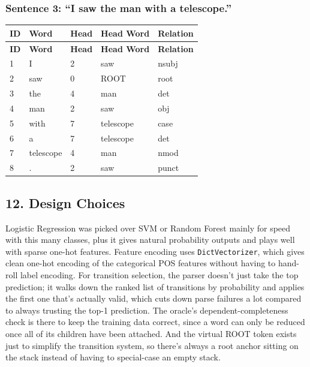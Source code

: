 \documentclass[11pt,a4paper]{article}
\begin{document}
\subsubsection*{Sentence 3: ``I saw the man with a telescope.''}

{\small
\setlength{\tabcolsep}{4pt}
\begin{longtable}{lllll}
\toprule
\textbf{ID} & \textbf{Word} & \textbf{Head} & \textbf{Head Word} & \textbf{Relation} \\
\midrule
\endfirsthead
\toprule
\textbf{ID} & \textbf{Word} & \textbf{Head} & \textbf{Head Word} & \textbf{Relation} \\
\midrule
\endhead
1 & I & 2 & saw & nsubj \\
2 & saw & 0 & ROOT & root \\
3 & the & 4 & man & det \\
4 & man & 2 & saw & obj \\
5 & with & 7 & telescope & case \\
6 & a & 7 & telescope & det \\
7 & telescope & 4 & man & nmod \\
8 & . & 2 & saw & punct \\
\bottomrule
\end{longtable}}

\subsection*{12. Design Choices}

Logistic Regression was picked over SVM or Random Forest mainly for speed with this many classes, plus it gives natural probability outputs and plays well with sparse one-hot features. Feature encoding uses \texttt{DictVectorizer}, which gives clean one-hot encoding of the categorical POS features without having to hand-roll label encoding. For transition selection, the parser doesn't just take the top prediction; it walks down the ranked list of transitions by probability and applies the first one that's actually valid, which cuts down parse failures a lot compared to always trusting the top-1 prediction. The oracle's dependent-completeness check is there to keep the training data correct, since a word can only be reduced once all of its children have been attached. And the virtual ROOT token exists just to simplify the transition system, so there's always a root anchor sitting on the stack instead of having to special-case an empty stack.
\end{document}
